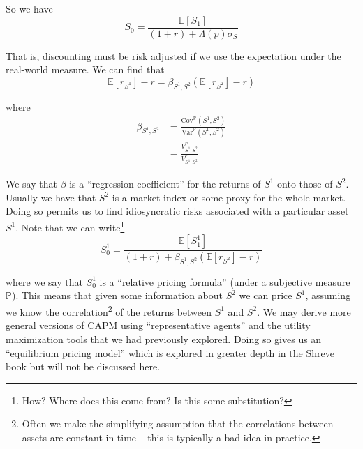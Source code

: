 \documentclass[12pt]{article}
\newlength\tindent
\renewcommand{\indent}{\hspace*{\tindent}}
\renewcommand{\P}{\mathbb P}
\newcommand{\E}{\mathbb E}
\newcommand{\var}{\mathrm{Var}}
\newcommand{\cov}{\mathrm{Cov}}
\begin{document}
So we have
\begin{equation*}
	S_0 = \frac{ \E[S_1] }{ (1 + r) + \Lambda(p)\sigma_S }
\end{equation*}

\indent That is, discounting must be risk adjusted if we use the expectation under the real-world measure. We can find that
\begin{equation*}
	\E[r_{S^1}] - r = \beta_{S^1,S^2} \left( \E[r_{S^2}] - r \right)
\end{equation*}

where
\begin{align*}
	\beta_{S^1, S^2} &= \frac{ \cov^\P(S^1, S^2) }{ \var^\P(S^1, S^2) }\\
	&= \frac{ V^\P_{S^1, S^2} }{ V^\P_{S^1, S^2} }
\end{align*}

\indent We say that $\beta$ is a ``regression coefficient'' for the returns of $S^1$ onto those of $S^2$. Usually we have that $S^2$ is a market index or some proxy for the whole market. Doing so permits us to find idiosyncratic risks associated with a particular asset $S^1$. Note that we can write\footnote{How? Where does this come from? Is this some substitution?}
\begin{equation*}
	S^1_0 = \frac{ \E[S^1_1] }{(1 + r) + \beta_{S^1, S^2}(\E[r_{S^2}] - r)}
\end{equation*}

where we say that $S^1_0$ is a ``relative pricing formula'' (under a subjective measure $\P$). This means that given some information about $S^2$ we can price $S^1$, assuming we know the correlation\footnote{Often we make the simplifying assumption that the correlations between assets are constant in time -- this is typically a bad idea in practice.} of the returns between $S^1$ and $S^2$. We may derive more general versions of CAPM using ``representative agents'' and the utility maximization tools that we had previously explored. Doing so gives us an ``equilibrium pricing model'' which is explored in greater depth in the Shreve book but will not be discussed here.
\end{document}
